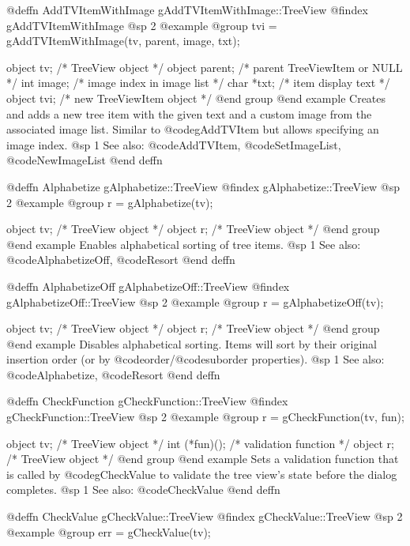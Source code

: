 @deffn {AddTVItemWithImage} gAddTVItemWithImage::TreeView
@findex gAddTVItemWithImage
@sp 2
@example
@group
tvi = gAddTVItemWithImage(tv, parent, image, txt);

object  tv;       /*  TreeView object              */
object  parent;   /*  parent TreeViewItem or NULL   */
int     image;    /*  image index in image list     */
char    *txt;     /*  item display text             */
object  tvi;      /*  new TreeViewItem object       */
@end group
@end example
Creates and adds a new tree item with the given text and a custom image
from the associated image list.  Similar to @code{gAddTVItem} but allows
specifying an image index.
@sp 1
See also:  @code{AddTVItem}, @code{SetImageList}, @code{NewImageList}
@end deffn



@deffn {Alphabetize} gAlphabetize::TreeView
@findex gAlphabetize::TreeView
@sp 2
@example
@group
r = gAlphabetize(tv);

object  tv;   /*  TreeView object  */
object  r;    /*  TreeView object  */
@end group
@end example
Enables alphabetical sorting of tree items.
@sp 1
See also:  @code{AlphabetizeOff}, @code{Resort}
@end deffn



@deffn {AlphabetizeOff} gAlphabetizeOff::TreeView
@findex gAlphabetizeOff::TreeView
@sp 2
@example
@group
r = gAlphabetizeOff(tv);

object  tv;   /*  TreeView object  */
object  r;    /*  TreeView object  */
@end group
@end example
Disables alphabetical sorting.  Items will sort by their original
insertion order (or by @code{order}/@code{suborder} properties).
@sp 1
See also:  @code{Alphabetize}, @code{Resort}
@end deffn



@deffn {CheckFunction} gCheckFunction::TreeView
@findex gCheckFunction::TreeView
@sp 2
@example
@group
r = gCheckFunction(tv, fun);

object  tv;    /*  TreeView object              */
int     (*fun)();  /*  validation function       */
object  r;     /*  TreeView object              */
@end group
@end example
Sets a validation function that is called by @code{gCheckValue} to
validate the tree view's state before the dialog completes.
@sp 1
See also:  @code{CheckValue}
@end deffn



@deffn {CheckValue} gCheckValue::TreeView
@findex gCheckValue::TreeView
@sp 2
@example
@group
err = gCheckValue(tv);

